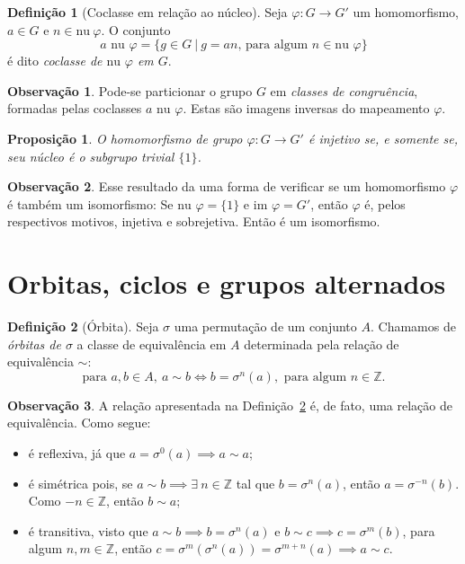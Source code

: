 \documentclass[a4paper,12pt]{report}
\theoremstyle{plain}
\newtheorem{proposicao}{Proposição}[section]
\theoremstyle{definition}
\newtheorem{definicao}{Definição}[section]
\newtheorem{observacao}{Observação}[section]
\begin{document}
\begin{definicao}[Coclasse em relação ao núcleo]
	Seja \(\varphi: G\longrightarrow G'\) um
	homomorfismo, \(a \in G\) e \(n\in\text{nu}\ \varphi\). O conjunto
	\[a\text{ nu }\varphi = \{g\in G \ | \ g = an \text{, para algum } n\in\text{nu }\varphi\}\] é dito \emph{coclasse de \(\text{nu }\varphi\) em \(G\)}.	
\end{definicao}

\begin{observacao}
	Pode-se particionar o grupo \(G\) em \emph{classes de congruência},
	formadas pelas coclasses \(a\text{ nu }\varphi\). Estas são imagens
	inversas do mapeamento \(\varphi\).
\end{observacao}

\begin{proposicao}
	O homomorfismo de grupo
	\(\varphi: G\longrightarrow G'\) é injetivo se, e somente se, seu núcleo
	é o subgrupo trivial \(\{1\}\).	
\end{proposicao}

\begin{observacao}
	Esse resultado da uma forma de verificar se um homomorfismo \(\varphi\)
	é também um isomorfismo: Se \(\text{nu }\varphi = \{1\}\) e
	\(\text{im } \varphi = G'\), então \(\varphi\) é, pelos respectivos
	motivos, injetiva e sobrejetiva. Então é um isomorfismo.
\end{observacao}

\section{Orbitas, ciclos e grupos alternados}

\begin{definicao}[Órbita]\label{def:orbit}
	Seja $\sigma$ uma permutação de um conjunto $A$. Chamamos de \emph{órbitas de $\sigma$} a classe de equivalência em $A$ determinada pela relação de equivalência $\sim$:
	$$\text{para }a,b \in A,\ a\sim b \iff b=\sigma^n(a), \text{ para algum }n\in\mathbb{Z}.$$
\end{definicao}

\begin{observacao}
	A relação apresentada na Definição~\ref{def:orbit} é, de fato, uma relação de equivalência. Como segue:
	\begin{itemize}
		\item é reflexiva, já que $a = \sigma^0(a) \implies a\sim a$;
		\item é simétrica pois, se $a\sim b \implies \exists\  n\in \mathbb{Z}$ tal que $b = \sigma^n(a)$, então $a = \sigma^{-n}(b)$. Como $-n\in\mathbb{Z}$, então $b\sim a$;
		\item é transitiva, visto que $a\sim b \implies b=\sigma^n(a)$ e $b \sim c \implies c = \sigma^m(b)$, para algum $n,m\in\mathbb{Z}$, então $c=\sigma^m(\sigma^n(a)) = \sigma^{m+n}(a) \implies a\sim c$.
	\end{itemize}
\end{observacao}
\end{document}
